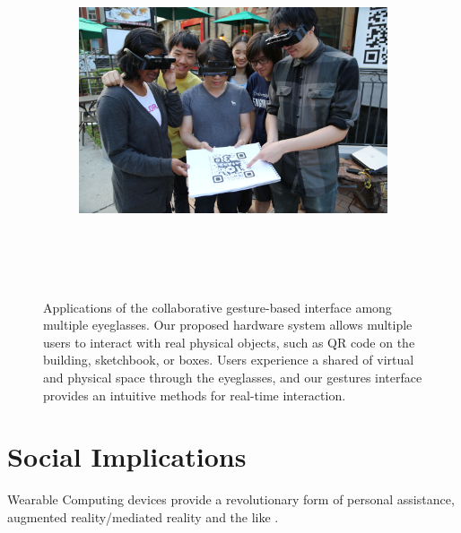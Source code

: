 \begin{figure}
        \begin{subfigure}[b]{\textwidth}
                \centering
\includegraphics[height=4in]{ch5/figs/wearable/low_res/3_eyeglass_paper_2_IMG_2175.jpg} 
                \caption{}
                \label{fig:qr_paper}
        \end{subfigure}
        
        \caption{Applications of the collaborative gesture-based interface among multiple eyeglasses. Our proposed hardware system allows multiple users to interact with real physical objects, such as QR code on the building, sketchbook, or boxes. Users experience a shared of virtual and physical space through the eyeglasses, and our gestures interface provides an intuitive methods for real-time interaction.}\label{fig:wearable_qr}
\end{figure}

\section{Social Implications}
Wearable Computing devices provide a revolutionary form of personal assistance, augmented reality/mediated reality and the like \cite{hill2004reality,aimone2003eyetap}.

